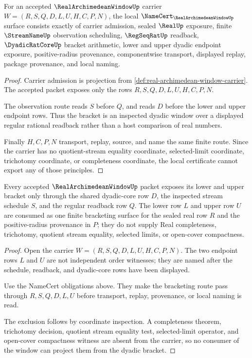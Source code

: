 \begin{theorem}
\label{thm:real-archimedean-window-namecert-obligations}
For an accepted $\RealArchimedeanWindowUp$ carrier $W=(R,S,Q,D,L,U,H,C,P,N)$, the local $\NameCert_{\RealArchimedeanWindowUp}$ surface consists exactly of carrier admission, sealed $\RealUp$ exposure, finite $\StreamNameUp$ observation scheduling, $\RegSeqRatUp$ readback, $\DyadicRatCoreUp$ bracket arithmetic, lower and upper dyadic endpoint exposure, positive-radius provenance, componentwise transport, displayed replay, package provenance, and local naming.
\end{theorem}
\begin{proof}
Carrier admission is projection from \autoref{def:real-archimedean-window-carrier}. The accepted packet exposes only the rows $R,S,Q,D,L,U,H,C,P,N$.

The observation route reads $S$ before $Q$, and reads $D$ before the lower and upper endpoint rows. Thus the bracket is an inspected dyadic window over a displayed regular rational readback rather than a host comparison of real numbers.

Finally $H,C,P,N$ transport, replay, source, and name the same finite route. Since the carrier has no quotient-stream equality coordinate, selected-limit coordinate, trichotomy coordinate, or completeness coordinate, the local certificate cannot export any of those principles.
\end{proof}

\begin{theorem}
\label{thm:real-archimedean-window-dyadic-bracket}
Every accepted $\RealArchimedeanWindowUp$ packet exposes its lower and upper bracket only through the shared dyadic-core row $D$, the inspected stream schedule $S$, and the regular readback row $Q$. The lower row $L$ and upper row $U$ are consumed as one finite bracketing surface for the sealed real row $R$ and the positive-radius provenance in $P$; they do not supply Real completeness, trichotomy, quotient stream equality, selected limits, or open-cover compactness.
\end{theorem}
\begin{proof}
Open the carrier $W=(R,S,Q,D,L,U,H,C,P,N)$. The two endpoint rows $L$ and $U$ are not independent order witnesses; they are named after the schedule, readback, and dyadic-core rows have been displayed.

Use the NameCert obligations above. They make the bracketing route pass through $R,S,Q,D,L,U$ before transport, replay, provenance, or local naming is read.

The exclusion follows by coordinate inspection. A completeness theorem, trichotomy decision, quotient stream equality test, selected-limit operator, and open-cover compactness witness are absent from the carrier, so no consumer of the window can project them from the dyadic bracket.
\end{proof}

